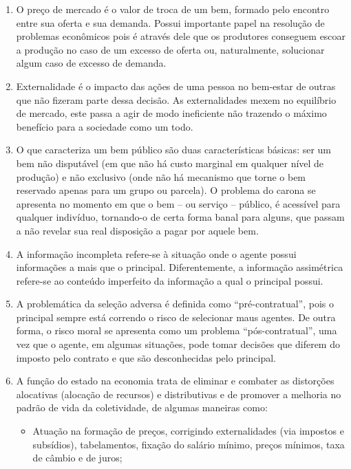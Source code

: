 \documentclass[a4paper, 12pt]{article}
\begin{document}
\begin{enumerate}
	\item O preço de mercado é o valor de troca de um bem, formado pelo encontro entre sua oferta e sua demanda. Possui importante papel na resolução de problemas econômicos pois é através dele que os produtores conseguem escoar a produção no caso de um excesso de oferta ou, naturalmente, solucionar algum caso de excesso de demanda.
	\\

	\item
	Externalidade é o impacto das ações de uma pessoa no bem-estar de outras que não fizeram parte dessa decisão. As externalidades mexem no equilíbrio de mercado, este passa a agir de modo ineficiente não trazendo o máximo benefício para a sociedade como um todo.
	\\

	\item O que caracteriza um bem público são duas características básicas: ser um bem não disputável (em que não há custo marginal em qualquer nível de produção) e não exclusivo (onde não há mecanismo que torne o bem reservado apenas para um grupo ou parcela). O problema do carona se apresenta no momento em que o bem – ou serviço – público, é acessível para qualquer indivíduo, tornando-o de certa forma banal para alguns, que passam a não revelar sua real disposição a pagar por aquele bem.
	\\

	\item A informação incompleta refere-se à situação onde o agente possui informações a mais que o principal. Diferentemente, a informação assimétrica refere-se ao conteúdo imperfeito da informação a qual o principal possui.
	\\

	\item A problemática da seleção adversa é definida como “pré-contratual”, pois o principal sempre está correndo o risco de selecionar maus agentes. De outra forma, o risco moral se apresenta como um problema “pós-contratual”, uma vez que o agente, em algumas situações, pode tomar decisões que diferem do imposto pelo contrato e que são desconhecidas pelo principal.
	\\

	\item A função do estado na economia trata de eliminar e combater as distorções alocativas (alocação de recursos) e distributivas e de promover a melhoria no padrão de vida da coletividade, de algumas maneiras como:
	\begin{itemize}
		\item Atuação na formação de preços, corrigindo externalidades (via impostos e subsídios), tabelamentos, fixação do salário mínimo, preços mínimos, taxa de câmbio e de juros;\\


\end{itemize}
\end{enumerate}
\end{document}
